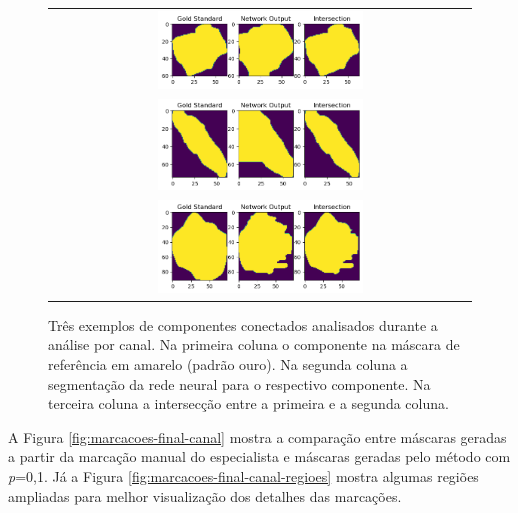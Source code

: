 \begin{figure}[H]
    \centering
    
    \begin{tabular}{@{}c@{}}
        \includegraphics[width=0.5\textwidth]{figures/4_results/components/305_r10c7_component_1.png} \\
        \includegraphics[width=0.5\textwidth]{figures/4_results/components/305_r11c7_component_1.png} \\
        \includegraphics[width=0.5\textwidth]{figures/4_results/components/305_r12c11_component_1.png} 
    \end{tabular}

    \caption[Exemplos de componentes conectados obtidos pelo método proposto.]{Três exemplos de componentes conectados analisados durante a análise por canal. Na primeira coluna o componente na máscara de referência em amarelo (padrão ouro). Na segunda coluna a segmentação da rede neural para o respectivo componente. Na terceira coluna a intersecção entre a primeira e a segunda coluna.}
    \label{fig:intersection-net}
\end{figure}

A Figura \ref{fig:marcacoes-final-canal} mostra a comparação entre máscaras geradas a partir da marcação manual do especialista e máscaras geradas pelo método com \textit{p}=0,1. Já a Figura \ref{fig:marcacoes-final-canal-regioes} mostra algumas regiões ampliadas para melhor visualização dos detalhes das marcações.

